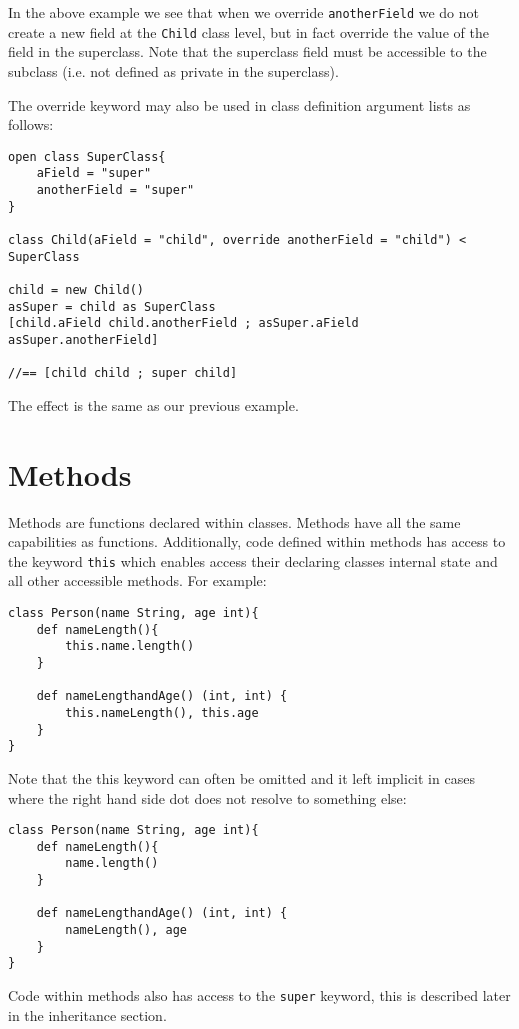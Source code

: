 \documentclass[conc-doc]{subfiles}
\begin{document}
In the above example we see that when we override \lstinline{anotherField} we do not create a new field at the \lstinline{Child} class level, but in fact override the value of the field in the superclass. Note that the superclass field must be accessible to the subclass (i.e. not defined as private in the superclass).

The override keyword may also be used in class definition argument lists as follows:
\begin{lstlisting}
open class SuperClass{
	aField = "super"
	anotherField = "super"
}

class Child(aField = "child", override anotherField = "child") < SuperClass

child = new Child()
asSuper = child as SuperClass
[child.aField child.anotherField ; asSuper.aField asSuper.anotherField]

//== [child child ; super child]
\end{lstlisting}

The effect is the same as our previous example.

\section{Methods}
Methods are functions declared within classes. Methods have all the same capabilities as functions. Additionally, code defined within methods has access to the keyword \lstinline{this} which enables access their declaring classes internal state and all other accessible methods. For example:

\begin{lstlisting}
class Person(name String, age int){
	def nameLength(){
		this.name.length()
	}
	
	def nameLengthandAge() (int, int) {
		this.nameLength(), this.age
	}
}
\end{lstlisting}

Note that the this keyword can often be omitted and it left implicit in cases where the right hand side dot does not resolve to something else:

\begin{lstlisting}
class Person(name String, age int){
	def nameLength(){
		name.length()
	}
	
	def nameLengthandAge() (int, int) {
		nameLength(), age
	}
}
\end{lstlisting}

Code within methods also has access to the \lstinline{super} keyword, this is described later in the inheritance section.
\end{document}
